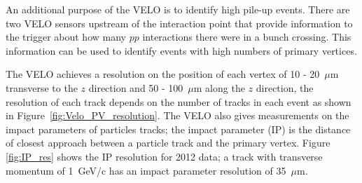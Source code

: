 

An additional purpose of the VELO is to identify high pile-up events. There are two VELO sensors upstream of the interaction point that provide information to the trigger about how many $pp$ interactions there were in a bunch crossing. This information can be used to identify events with high numbers of primary vertices. %

The VELO achieves a resolution on the position of each vertex of 10 - 20~$\mu$m transverse to the $z$ direction and 50 - 100~$\mu$m along the $z$ direction, the resolution of each track depends on the number of tracks in each event as shown in Figure~\ref{fig:Velo_PV_resolution}. The VELO also gives measurements on the impact parameters of particles tracks; the impact parameter (IP) is the distance of closest approach between a particle track and the primary vertex. Figure \ref{fig:IP_res} shows the IP resolution for 2012 data; a track with transverse momentum of 1~GeV/c has an impact parameter resolution of 35~$\mu$m. 



